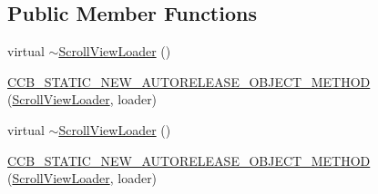 \subsection*{Public Member Functions}
\begin{DoxyCompactItemize}
\item 
virtual \hyperlink{classcocosbuilder_1_1ScrollViewLoader_a80a67135753e688204e833bfa563c4c7}{$\sim$\+Scroll\+View\+Loader} ()
\item 
\hyperlink{classcocosbuilder_1_1ScrollViewLoader_a6fb5e489b5fd91deb3878bfe340fddfb}{C\+C\+B\+\_\+\+S\+T\+A\+T\+I\+C\+\_\+\+N\+E\+W\+\_\+\+A\+U\+T\+O\+R\+E\+L\+E\+A\+S\+E\+\_\+\+O\+B\+J\+E\+C\+T\+\_\+\+M\+E\+T\+H\+OD} (\hyperlink{classcocosbuilder_1_1ScrollViewLoader}{Scroll\+View\+Loader}, loader)
\item 
virtual \hyperlink{classcocosbuilder_1_1ScrollViewLoader_a80a67135753e688204e833bfa563c4c7}{$\sim$\+Scroll\+View\+Loader} ()
\item 
\hyperlink{classcocosbuilder_1_1ScrollViewLoader_a6fb5e489b5fd91deb3878bfe340fddfb}{C\+C\+B\+\_\+\+S\+T\+A\+T\+I\+C\+\_\+\+N\+E\+W\+\_\+\+A\+U\+T\+O\+R\+E\+L\+E\+A\+S\+E\+\_\+\+O\+B\+J\+E\+C\+T\+\_\+\+M\+E\+T\+H\+OD} (\hyperlink{classcocosbuilder_1_1ScrollViewLoader}{Scroll\+View\+Loader}, loader)
\end{DoxyCompactItemize}
